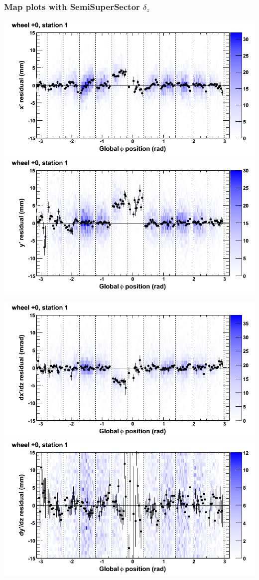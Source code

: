 \documentclass[compress]{beamer}
\begin{document}
\begin{frame}
\frametitle{Map plots with SemiSuperSector $\delta_z$}
\includegraphics[width=0.5\linewidth]{zfit_mapplots/DTvsphi_st1whC_x.png}
\includegraphics[width=0.5\linewidth]{zfit_mapplots/DTvsphi_st1whC_y.png}

\includegraphics[width=0.5\linewidth]{zfit_mapplots/DTvsphi_st1whC_dxdz.png}
\includegraphics[width=0.5\linewidth]{zfit_mapplots/DTvsphi_st1whC_dydz.png}
\end{frame}
\end{document}
